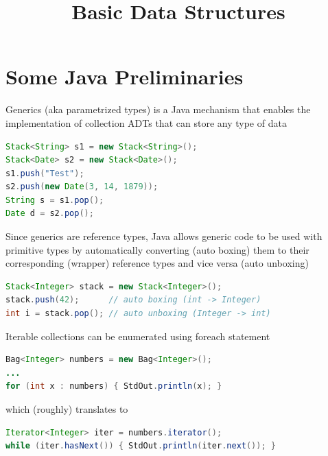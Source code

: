 \documentclass[8pt,a4paper,compress]{beamer}
\title{Basic Data Structures}
\date{}
\begin{document}
\begin{frame}
\vfill
\titlepage
\end{frame}

\section{Some Java Preliminaries}
\begin{frame}[fragile]
\pause

Generics (aka parametrized types) is a Java mechanism that enables the implementation of collection ADTs that can store any type of data

\smallskip

\begin{lstlisting}[language=Java,style=focusin]
Stack<String> s1 = new Stack<String>();
Stack<Date> s2 = new Stack<Date>();
s1.push("Test");
s2.push(new Date(3, 14, 1879));
String s = s1.pop();
Date d = s2.pop();
\end{lstlisting}

\pause\bigskip

Since generics are reference types, Java allows generic code to be used with primitive types by automatically converting (auto boxing) them to their corresponding (wrapper) reference types and vice versa (auto unboxing)

\smallskip

\begin{lstlisting}[language=Java,style=focusin]
Stack<Integer> stack = new Stack<Integer>();
stack.push(42);      // auto boxing (int -> Integer)
int i = stack.pop(); // auto unboxing (Integer -> int)
\end{lstlisting}

\pause\bigskip

Iterable collections can be enumerated using foreach statement 

\smallskip

\begin{lstlisting}[language=Java,style=focusin]
Bag<Integer> numbers = new Bag<Integer>();
...
for (int x : numbers) { StdOut.println(x); }
\end{lstlisting}

\smallskip

which (roughly) translates to 

\smallskip

\begin{lstlisting}[language=Java,style=focusin]
Iterator<Integer> iter = numbers.iterator();
while (iter.hasNext()) { StdOut.println(iter.next()); }
\end{lstlisting}
\end{frame}
\end{document}
